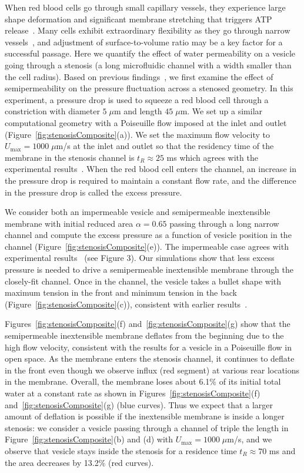 \documentclass[prb,preprint,showpacs,preprintnumbers,amsmath,amssymb,longbibliography]{revtex4-1}
\begin{document}
When red blood cells go through small capillary vessels, they experience
large shape deformation and significant membrane stretching that
triggers ATP release~\cite{Wan2008_PNAS, ForsythWan2011_PNAS}. Many
cells exhibit extraordinary flexibility as they go through narrow
vessels~\cite{AuStoreyMoore2016_PNAS}, and adjustment of
surface-to-volume ratio may be a key factor for a successful passage.
Here we quantify the effect of water permeability on a vesicle going
through a stenosis (a long microfluidic channel with a width smaller
than the cell radius). Based on previous
findings~\cite{abk-fai-sto2006}, we first examine the effect of
semipermeability on the pressure fluctuation across a stenosed geometry.
In this experiment, a pressure drop is used to squeeze a red blood cell
through a constriction with diameter $5\;\mu$m and length $45\;\mu$m. We
set up a similar computational geometry with a Poiseuille flow imposed
at the inlet and outlet (Figure~\ref{fig:stenosisComposite}(a)). We set
the maximum flow velocity to $U_{\max} = 1000 \;\mu$m/s at the inlet and
outlet so that the residency time of the membrane in the stenosis
channel is $t_R \approx 25$ ms which agrees with the experimental
results~\cite{abk-fai-sto2006}. When the red blood cell enters the
channel, an increase in the pressure drop is required to maintain a
constant flow rate, and the difference in the pressure drop is called
the excess pressure.

We consider both an impermeable vesicle and semipermeable inextensible
membrane with initial reduced area $\alpha = 0.65$ passing through a
long narrow channel and compute the excess pressure as a function of
vesicle position in the channel (Figure~\ref{fig:stenosisComposite}(e)).
The impermeable case agrees with experimental
results~\cite{abk-fai-sto2006} (see Figure 3). Our simulations show that
less excess pressure is needed to drive a semipermeable inextensible
membrane through the closely-fit channel. Once in the channel, the
vesicle takes a bullet shape with maximum tension in the front and
minimum tension in the back (Figure~\ref{fig:stenosisComposite}(c)),
consistent with earlier results~\cite{Pak2015_PNAS,
HarmanBertrandJoos2017_CJP}.

Figures~\ref{fig:stenosisComposite}(f)
and~\ref{fig:stenosisComposite}(g) show that the semipermeable
inextensible membrane deflates from the beginning due to the high flow
velocity, consistent with the results for a vesicle in a Poiseuille flow
in open space. As the membrane enters the stenosis channel, it continues
to deflate in the front even though we observe influx (red segment) at
various rear locations in the membrane. Overall, the membrane loses
about 6.1\% of its initial total water at a constant rate as shown in
Figures~\ref{fig:stenosisComposite}(f)
and~\ref{fig:stenosisComposite}(g) (blue curves). Thus we expect that a
larger amount of deflation is possible if the inextensible membrane is
inside a longer stenosis: we consider a vesicle passing through a
channel of triple the length in Figure~\ref{fig:stenosisComposite}(b)
and (d) with $U_{\max}=1000\;\mu$m/s, and we observe that vesicle stays
inside the stenosis for a residence time $t_R \approx 70$ ms and the
area decreases by 13.2\% (red curves).
\end{document}

